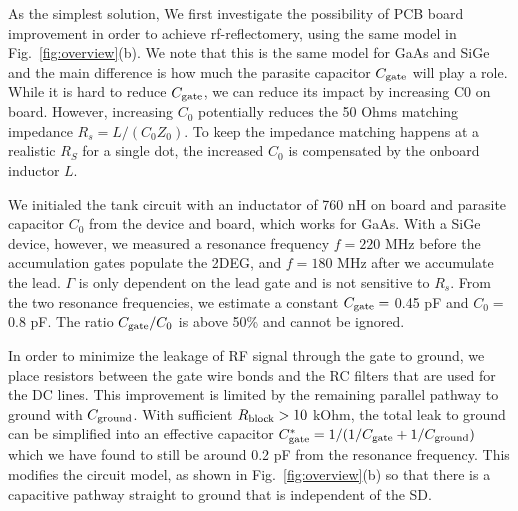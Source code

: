 \documentclass[]{article}
\begin{document}
	
	As the simplest solution, We first investigate the possibility of PCB board improvement in order to achieve rf-reflectomery, using the same model in Fig.\ \ref{fig:overview}(b). We note that this is the same model for GaAs and SiGe and the main difference is how much the parasite capacitor $C_{\rm gate}$ will play a role. While it is hard to reduce $C_{\rm gate}$, we can reduce its impact by increasing C0 on board. However, increasing $C_0$ potentially reduces the 50 Ohms matching impedance $R_s=L/(C_0Z_0)$. To keep the impedance matching happens at a realistic $R_S$ for a single dot, the increased $C_0$ is compensated by the onboard inductor $L$.
	
	We initialed the tank circuit with an inductator of 760 nH on board and parasite capacitor $C_0$ from the device and board, which works for GaAs. With a SiGe device, however, we measured a resonance frequency $f=220$ MHz before the accumulation gates populate the 2DEG, and $f = 180$ MHz after we accumulate the lead. $\Gamma$ is only dependent on the lead gate and is not sensitive to $R_s$. From the two resonance frequencies, we estimate a constant $C_{\rm gate} =$  0.45 pF and $C_0=$ 0.8 pF. The ratio $C_{\rm gate}/C_0$ is above 50\% and cannot be ignored. 
	
	In order to minimize the leakage of RF signal through the gate to ground, we place resistors between the gate wire bonds and the RC filters that are used for the DC lines. This improvement is limited by the remaining parallel pathway to ground with $C_{\rm ground}$. With sufficient $R_{\rm block} > 10$ kOhm, the total leak to ground can be simplified into an effective capacitor $C^*_{\rm gate} = 1/(1/{C_{\rm gate}}+1/C_{\rm ground})$ which we have found to still be around 0.2 pF from the resonance frequency. This modifies the circuit model, as shown in Fig.\ \ref{fig:overview}(b) so that there is a capacitive pathway straight to ground that is independent of the SD.   
	
\end{document}

